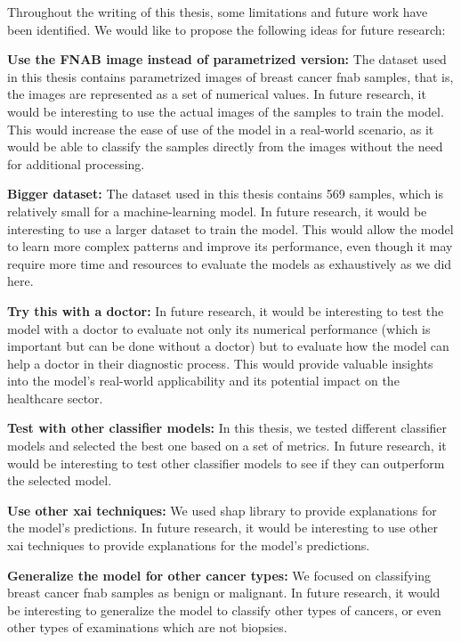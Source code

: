 Throughout the writing of this thesis, some limitations and future work have been identified. We would like to propose the following ideas for future research:

\textbf{Use the FNAB image instead of parametrized version:} The dataset used in this thesis contains parametrized images of breast cancer \ac{fnab} samples, that is, the images are represented as a set of numerical values. In future research, it would be interesting to use the actual images of the samples to train the model. This would increase the ease of use of the model in a real-world scenario, as it would be able to classify the samples directly from the images without the need for additional processing.

\textbf{Bigger dataset:} The dataset used in this thesis contains 569 samples, which is relatively small for a machine-learning model. In future research, it would be interesting to use a larger dataset to train the model. This would allow the model to learn more complex patterns and improve its performance, even though it may require more time and resources to evaluate the models as exhaustively as we did here.

\textbf{Try this with a doctor:} In future research, it would be interesting to test the model with a doctor to evaluate not only its numerical performance (which is important but can be done without a doctor) but to evaluate how the model can help a doctor in their diagnostic process. This would provide valuable insights into the model's real-world applicability and its potential impact on the healthcare sector.

\textbf{Test with other classifier models:} In this thesis, we tested different classifier models and selected the best one based on a set of metrics. In future research, it would be interesting to test other classifier models to see if they can outperform the selected model. 

\textbf{Use other \ac{xai} techniques:} We used \ac{shap} library to provide explanations for the model's predictions. In future research, it would be interesting to use other \ac{xai} techniques to provide explanations for the model's predictions.

\textbf{Generalize the model for other cancer types:} We focused on classifying breast cancer \ac{fnab} samples as benign or malignant. In future research, it would be interesting to generalize the model to classify other types of cancers, or even other types of examinations which are not biopsies.